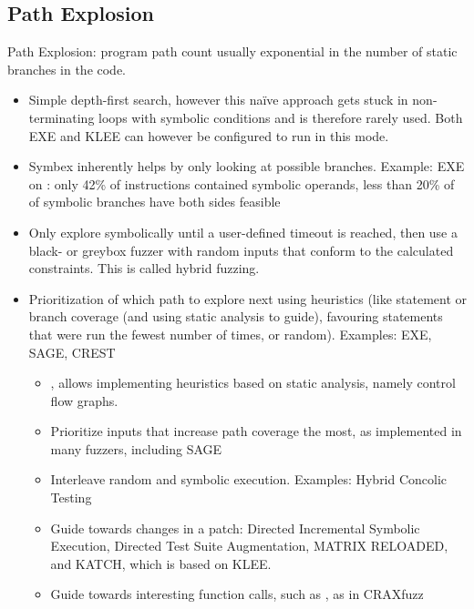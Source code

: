 \documentclass{article}
\begin{document}
\begin{multicols}{2}
    \subsection{Path Explosion}
    Path Explosion: program path count usually exponential in the number of static branches in the code.
    \begin{itemize}
        \item Simple depth-first search, however this naïve approach gets stuck in non-terminating loops with symbolic conditions and is therefore rarely used. Both EXE\cite{EXE} and KLEE\cite{KLEE} can however be configured to run in this mode.
        \item Symbex inherently helps by only looking at possible branches. Example: EXE\cite{EXE} on : only 42\% of instructions contained symbolic operands, less than 20\% of of symbolic branches have both sides feasible\cite{EXE}
        \item Only explore symbolically until a user-defined timeout is reached, then use a black- or greybox fuzzer with random inputs that conform to the calculated constraints. This is called hybrid fuzzing\cite{HybridFuzzTesting}.
        \item Prioritization of which path to explore next using heuristics (like statement or branch coverage (and using static analysis to guide), favouring statements that were run the fewest number of times, or random). Examples: EXE\cite{EXE}, SAGE\cite{SAGE}, CREST\cite{CREST}
              \begin{itemize}
                  \item {}\cite{ReviewThreeDecades}, allows implementing heuristics based on static analysis, namely control flow graphs.
                  \item Prioritize inputs that increase path coverage the most, as implemented in many fuzzers, including SAGE\cite{SAGE}
                  \item Interleave random and symbolic execution. Examples: Hybrid Concolic Testing\cite{HCT, Driller, Cyberdyne}
                  \item Guide towards changes in a patch: Directed Incremental Symbolic Execution\cite{DiSE}, Directed Test Suite Augmentation\cite{DTSA}, MATRIX RELOADED\cite{MATRIXRELOADED}, and KATCH\cite{KATCH}, which is based on KLEE\cite{KLEE}.
                  \item Guide towards interesting function calls, such as , as in CRAXfuzz\cite{CRAXfuzz}

\end{itemize}
\end{itemize}
\end{multicols}
\end{document}
